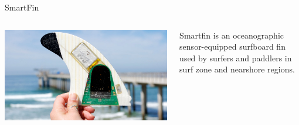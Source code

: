 \begin{frame}{SmartFin}
    \begin{columns}[c] %
        \begin{column}{0.5\textwidth}
            \centering
            \includegraphics[width=0.9\linewidth]{images/smartfin_picture.jpg}
        \end{column}
        \begin{column}{0.5\textwidth}
            \justifying %
            Smartfin is an oceanographic sensor-equipped surfboard fin used by surfers and paddlers in surf zone and nearshore regions.
        \end{column}
    \end{columns}
\end{frame}
